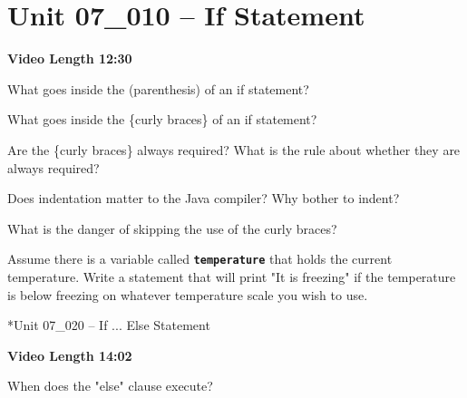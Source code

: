 \documentclass[letterpaper,12pt]{exam}
\newcommand{\unit}{Unit 07}
\begin{document}
\section*{\unit\_010 -- If Statement} %
\par{\selectfont\textbf{Video Length 12:30}}

\begin{questions}
\begin{samepage}
    \question What goes inside the (parenthesis) of an if statement?
    \vspace{5mm}
\end{samepage}
\begin{samepage}
    \question What goes inside the \{curly braces\} of an if statement?
    \vspace{5mm}
\end{samepage}
\begin{samepage}
    \question Are the \{curly braces\} always required?  What is the rule about whether they are always required?
    \vspace{5mm}
\end{samepage}
\begin{samepage}
    \question Does indentation matter to the Java compiler?  Why bother to indent?
    \vspace{5mm}
\end{samepage}

\begin{samepage}
    \question What is the danger of skipping the use of the curly braces?
    \vspace{5mm}
\end{samepage}
\begin{samepage}
    \question Assume there is a variable called \texttt{\textbf{temperature}} that holds the current temperature.  Write a statement that will print "It is freezing" if the temperature is below freezing on whatever temperature scale you wish to use.
    \vspace{40mm}
\end{samepage}

*{\unit\_020 -- If ... Else Statement} %
\par{\selectfont\textbf{Video Length 14:02}}

\begin{samepage}
    \question When does the "else" clause execute?
    \vspace{5mm}
\end{samepage}


\end{questions}
\end{document}
